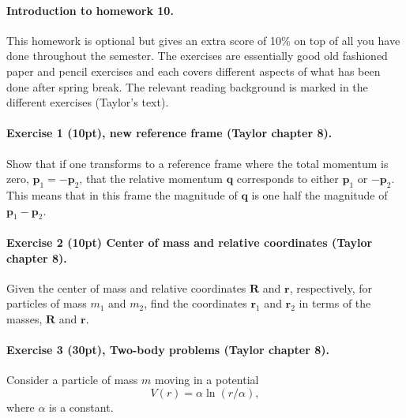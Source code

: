 \documentclass[%
oneside,                 %
final,                   %
10pt]{article}
\begin{document}
\noindent
\paragraph{Introduction to homework 10.}
This homework is optional but gives an extra score of 10\% on top of
all you have done throughout the semester. The exercises are
essentially good old fashioned paper and pencil exercises and each
covers different aspects of what has been done after spring break.
The relevant reading background is marked in the different exercises (Taylor's text).

\paragraph{Exercise 1 (10pt), new reference frame (Taylor chapter 8).}
Show that if one transforms to a reference frame where the total
momentum is zero, $\bm{p}_1=-\bm{p}_2$, that the relative momentum
$\bm{q}$ corresponds to either $\bm{p}_1$ or $-\bm{p}_2$. This
means that in this frame the magnitude of $\bm{q}$ is one half the
magnitude of $\bm{p}_1-\bm{p}_2$.

\paragraph{Exercise 2 (10pt) Center of mass and relative coordinates (Taylor chapter 8).}
Given the center of mass and relative coordinates $\bm{R}$ and $\bm{r}$, respectively, for
particles of mass $m_1$ and $m_2$, find the coordinates $\bm{r}_1$
and $\bm{r}_2$ in terms of the masses, $\bm{R}$ and $\bm{r}$.

\paragraph{Exercise 3 (30pt),  Two-body problems (Taylor chapter 8).}
Consider a particle of mass $m$ moving in a potential
\[
V(r)=\alpha\ln(r/\alpha),
\]
where $\alpha$ is a constant.
\end{document}
